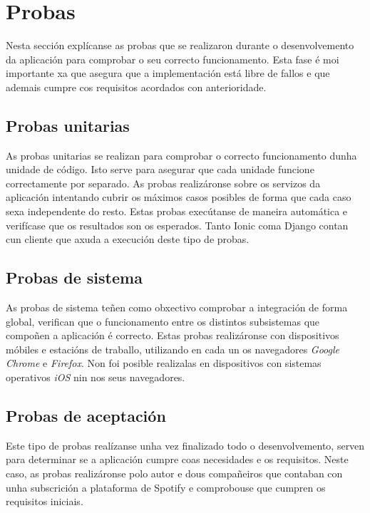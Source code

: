 \section{Probas}
Nesta sección explícanse as probas que se realizaron durante o desenvolvemento da aplicación para comprobar o seu correcto funcionamento. Esta fase é moi importante xa que asegura que a implementación está libre de fallos e que ademais cumpre cos requisitos acordados con anterioridade.

\subsection{Probas unitarias}
As probas unitarias se realizan para comprobar o correcto funcionamento dunha unidade de código. Isto serve para asegurar que cada unidade funcione correctamente por separado. As probas realizáronse sobre os servizos da aplicación intentando cubrir os máximos casos posibles de forma que cada caso sexa independente do resto. Estas probas execútanse de maneira automática e verifícase que os resultados son os esperados. Tanto Ionic coma Django contan cun cliente que axuda a execución deste tipo de probas.

\subsection{Probas de sistema}
As probas de sistema teñen como obxectivo comprobar a integración de forma global, verifican que o funcionamento entre os distintos subsistemas que compoñen a aplicación é correcto. Estas probas realizáronse con dispositivos móbiles e estacións de traballo, utilizando en cada un os navegadores \textit{Google Chrome} e \textit{Firefox}. Non foi posible realizalas en dispositivos con sistemas operativos \textit{iOS} nin nos seus navegadores.

\subsection{Probas de aceptación}
Este tipo de probas realízanse unha vez finalizado todo o desenvolvemento, serven para determinar se a aplicación cumpre coas necesidades e os requisitos. Neste caso, as probas realizáronse polo autor e dous compañeiros que contaban con unha subscrición a plataforma de Spotify e comprobouse que cumpren os requisitos iniciais.
